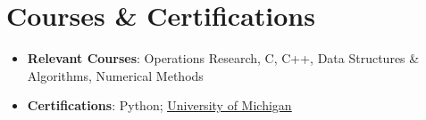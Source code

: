 \documentclass[letterpaper,11pt]{article}
\newcommand{\resumeSubHeadingListStart}{\begin{itemize}[leftmargin=*]}
\newcommand{\resumeSubHeadingListEnd}{\end{itemize}}
\begin{document}
\section{Courses \& Certifications}
  \resumeSubHeadingListStart
    \item{
      \textbf{Relevant Courses}{: Operations Research, C, C++, Data Structures \& Algorithms, Numerical Methods}
      \hfill
    }
    \item{
      \textbf{Certifications}{: Python}; \underline{\href{https://www.coursera.org/account/accomplishments/certificate/BGRL6KFPRFAL}{University of Michigan}}
      \hfill
    }
  \resumeSubHeadingListEnd



\end{document}
